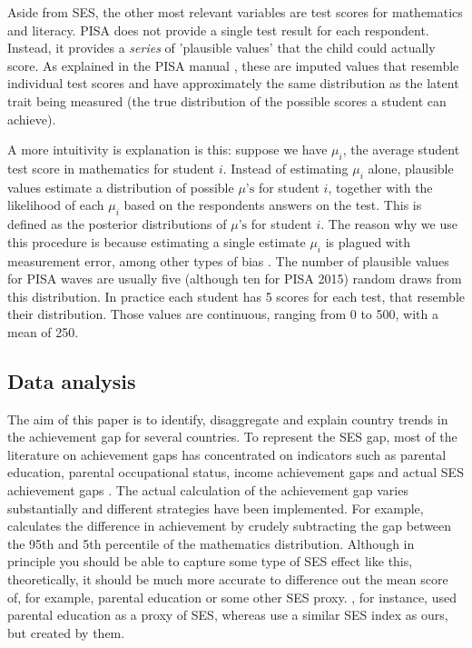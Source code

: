 \documentclass[11pt, a4paper]{article}\usepackage[]{graphicx}\usepackage[]{color}
\begin{document}
Aside from SES, the other most relevant variables are test scores for mathematics and literacy. PISA does not provide a single test result for each respondent. Instead, it provides a \emph{series} of 'plausible values' that the child could actually score. As explained in the PISA manual \citep{pisa2012_technical}, these are imputed values that resemble individual test scores and have approximately the same distribution as the latent trait being measured (the true distribution of the possible scores a student can achieve). 

A more intuitivity is explanation is this: suppose we have \(\mu_i\), the average student test score in mathematics for student \(i\). Instead of estimating \(\mu_i\) alone, plausible values estimate a distribution of possible \(\mu\text{'s}\) for student \(i\), together with the likelihood of each \(\mu_i\) based on the respondents answers on the test. This is defined as the posterior distributions of \(\mu\text{'s}\) for student \(i\). The reason why we use this procedure is because estimating a single estimate \(\mu_i\) is plagued with measurement error, among other types of bias \citep[see][]{wu2005}. The number of plausible values for PISA waves are usually five (although ten for PISA 2015) random draws from this distribution. In practice each student has 5 scores for each test, that resemble their distribution. Those values are continuous, ranging from 0 to 500, with a mean of 250.

\subsection{Data analysis}

The aim of this paper is to identify, disaggregate and explain country trends in the achievement gap for several countries. To represent the SES gap, most of the literature on achievement gaps has concentrated on indicators such as parental education, parental occupational status, income achievement gaps and actual SES achievement gaps \citep{fryer2004, hanushek_woesmann_tracking, saw2016, bradbury2015, byun2010}. The actual calculation of the achievement gap varies substantially and different strategies have been implemented. For example, \citet{micklewright} calculates the difference in achievement by crudely subtracting the gap between the 95th and 5th percentile of the mathematics distribution. Although in principle you should be able to capture some type of SES effect like this, theoretically, it should be much more accurate to difference out the mean score of, for example, parental education or some other SES proxy. \citet{saw2016}, for instance, used parental education as a proxy of SES, whereas \citet{byun2010} use a similar SES index as ours, but created by them.
\end{document}
